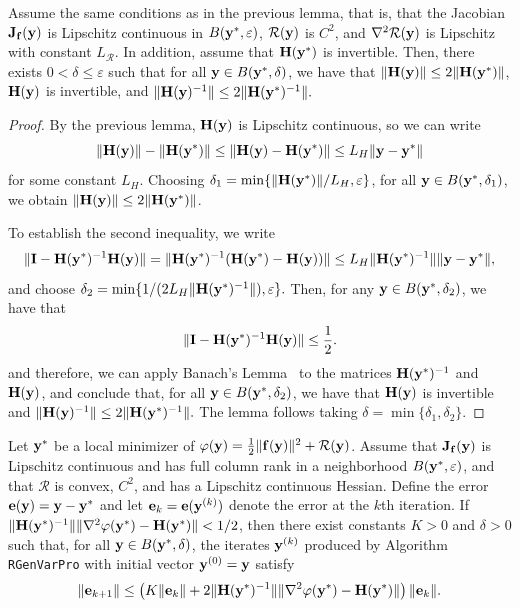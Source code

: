 \documentclass[onefignum,onetabnum]{siamart171218}
\newcommand{\bH}{{\bf H}}
\newcommand{\bI}{{\bf I}}
\newcommand{\bJ}{{\bf J}}
\newcommand{\be}{{\bf e}}
\newcommand{\bff}{{\bf f}}
\newcommand{\by}{{\bf y}}
\newcommand{\calR}{\mathcal{R}}
\begin{document}
\begin{lemma}\label{lem: Hinverse}
Assume the same conditions as in the previous lemma, that is, that the Jacobian $\bJ_{\bf f}(\by)$ is Lipschitz continuous in $B(\by^*, \varepsilon)$, $\calR(\by)$ is $C^2$, and $\nabla^2 \calR(\by)$ is Lipschitz with constant $L_\calR$. In addition, assume that $\bH(\by^*)$ is invertible. Then, there exists $0 < \delta \leq \varepsilon$ such that for all $\by \in B(\by^*, \delta)$, we have that
$\|\bH(\by)\| \leq 2 \|\bH(\by^*)\|$,
$\bH(\by)$ is invertible, and $\|\bH(\by)^{-1}\| \leq 2 \|\bH(\by^*)^{-1}\|.$
\end{lemma}
\begin{proof}
By the previous lemma, $\bH(\by)$ is Lipschitz continuous, so we can write
\begin{equation*}
\|\bH(\by)\| - \|\bH(\by^*)\| \leq \|\bH(\by) - \bH(\by^*)\| \leq L_H \|\by - \by^*\|
\end{equation*}
for some constant $L_H$. Choosing $\delta_1 =\min\{\|\bH(\by^*)\|/L_H, \varepsilon\}$, for all $\by \in B(\by^*, \delta_1)$, we obtain $\|\bH(\by)\| \leq 2 \|\bH(\by^*)\|$. 

To establish the second inequality, we write
\begin{equation*}
\|\bI - \bH(\by^*)^{-1} \bH(\by)\| = \|\bH(\by^*)^{-1} (\bH(\by^*) - \bH(\by))\| \leq L_H \|\bH(\by^*)^{-1}\|\|\by - \by^*\|,
\end{equation*}
and choose
$\delta_2 = \min\{ 1/ (2 L_H \|\bH(\by^*)^{-1}\|), \varepsilon\}.$
Then, for any $\by \in B(\by^*, \delta_2)$, we have that
\begin{equation*}
\|\bI - \bH(\by^*)^{-1} \bH(\by)\| \leq \frac{1}{2}.
\end{equation*}
and therefore, we can apply Banach’s Lemma~\cite[Theorem 1.2.1]{kelley1995iterative}  to the matrices $\bH(\by^*)^{-1}$ and $\bH(\by)$, and conclude that, for all  $\by \in B(\by^*, \delta_2)$, we have that $\bH(\by)$ is invertible and
$\|\bH(\by)^{-1}\| \leq 2 \|\bH(\by^*)^{-1}\|.$ The lemma follows taking $\delta = \min\{\delta_1, \delta_2\}$.
\end{proof}

\begin{theorem}\label{thm: error bound}
Let $\by^*$ be a local minimizer of $\varphi(\by) = \frac{1}{2} \|\bff(\by)\|^2 + \calR(\by)$. Assume that $\bJ_{\bf f}(\by)$ is Lipschitz continuous and has full column rank in a neighborhood $B(\by^*, \varepsilon)$, and that $\calR$ is convex, $C^2$,  and has a Lipschitz continuous Hessian. Define the error $\be(\by) = \by - \by^*$ and let ${\be}_k = \be(\by^{(k)})$ denote the error at the $k$th iteration. If $ \|\bH(\by^*)^{-1}\|\|\nabla^2\varphi(\by^*)-\bH(\by^*)\| < 1/2$, then there exist constants $K > 0$ and $\delta > 0$ such that, for all $\by \in B(\by^*, \delta)$, the iterates $\by^{(k)}$ produced by Algorithm \texttt{RGenVarPro} with initial vector $\by^{(0)}=\by$ satisfy
\begin{equation*}
\|\be_{k+1}\| \leq \left(K \|\be_{k}\| + 2 \|\bH(\by^*)^{-1}\|\|\nabla^2 \varphi(\by^*) - \bH(\by^*)\| \right) \|\be_{k}\|.
\end{equation*}
\end{theorem}
\end{document}
